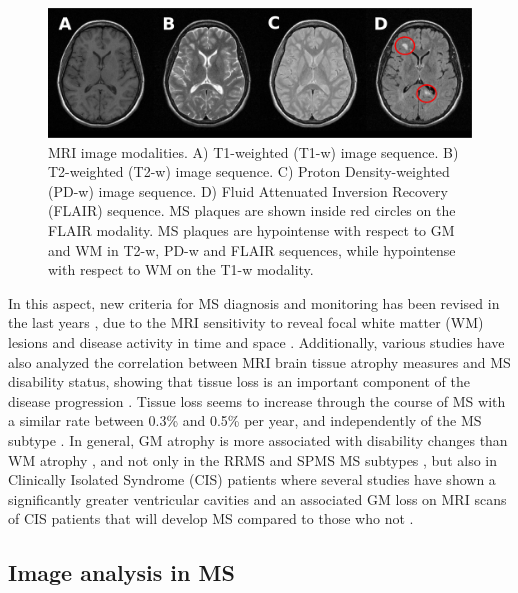 \begin{figure}[top]
  \begin{center}
    \includegraphics[width=1\textwidth]{figures/figure_1.eps}
  \end{center}
    \caption{MRI image modalities. A) T1-weighted (T1-w) image sequence. B) T2-weighted (T2-w) image sequence. C) Proton Density-weighted (PD-w) image sequence. D) Fluid Attenuated Inversion Recovery (FLAIR) sequence. MS plaques are shown inside red circles on the FLAIR modality. MS plaques are hypointense with respect to GM and WM in T2-w, PD-w and FLAIR sequences, while hypointense with respect to WM on the T1-w modality.}
    \label{mri_modalities}
\end{figure}

In this aspect, new criteria for MS diagnosis and monitoring has been revised in the last years \cite{Polman2011}, due to the MRI sensitivity to reveal focal white matter (WM) lesions and disease activity in time and space \cite{Filippi2011}. Additionally, various studies have also analyzed the correlation between MRI brain tissue atrophy measures and MS disability status, showing that tissue loss is an important component of the disease progression \cite{Chard2002, Filippi2013, Fisher2008, Rudick2009}. Tissue loss seems to increase through the course of MS with a similar rate between 0.3\% and 0.5\% per year, and independently of the MS subtype \cite{DeStefano2010, Rudick2009}. In general, GM atrophy is more associated with disability changes than WM atrophy \cite{Fisniku2008}, and not only in the RRMS and SPMS MS subtypes \cite{Fisher2008, Rudick2009}, but also in Clinically Isolated Syndrome (CIS) patients where several studies have shown a significantly greater ventricular cavities and an associated GM loss on MRI scans of CIS patients that will develop MS compared to those who not \cite{Ceccarelli2010,Filippi2013}.

\subsection{Image analysis in MS}
\label{subsec:image_analysis}

